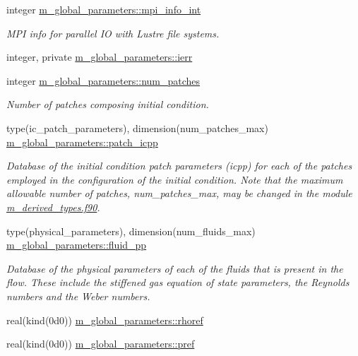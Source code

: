 \begin{DoxyCompactItemize}
\item 
integer \hyperlink{namespacem__global__parameters_a2663d07998d11d25e223cd7ad0bbd748}{m\+\_\+global\+\_\+parameters\+::mpi\+\_\+info\+\_\+int}
\begin{DoxyCompactList}\small\item\em M\+PI info for parallel IO with Lustre file systems. \end{DoxyCompactList}\item 
integer, private \hyperlink{namespacem__global__parameters_a46461347b5094736adfa94ef005b49a6}{m\+\_\+global\+\_\+parameters\+::ierr}
\item 
integer \hyperlink{namespacem__global__parameters_a5e346daa48cf24534ceca2f656a57255}{m\+\_\+global\+\_\+parameters\+::num\+\_\+patches}
\begin{DoxyCompactList}\small\item\em Number of patches composing initial condition. \end{DoxyCompactList}\item 
type(ic\+\_\+patch\+\_\+parameters), dimension(num\+\_\+patches\+\_\+max) \hyperlink{namespacem__global__parameters_ab5fc97fce88eefa124865cab08aa2250}{m\+\_\+global\+\_\+parameters\+::patch\+\_\+icpp}
\begin{DoxyCompactList}\small\item\em Database of the initial condition patch parameters (icpp) for each of the patches employed in the configuration of the initial condition. Note that the maximum allowable number of patches, num\+\_\+patches\+\_\+max, may be changed in the module \hyperlink{m__derived__types_8f90}{m\+\_\+derived\+\_\+types.\+f90}. \end{DoxyCompactList}\item 
type(physical\+\_\+parameters), dimension(num\+\_\+fluids\+\_\+max) \hyperlink{namespacem__global__parameters_a7297abec8863ecabf95e24ebdae46a17}{m\+\_\+global\+\_\+parameters\+::fluid\+\_\+pp}
\begin{DoxyCompactList}\small\item\em Database of the physical parameters of each of the fluids that is present in the flow. These include the stiffened gas equation of state parameters, the Reynolds numbers and the Weber numbers. \end{DoxyCompactList}\item 
real(kind(0d0)) \hyperlink{namespacem__global__parameters_a485a360d73013d7bce1daa01df404534}{m\+\_\+global\+\_\+parameters\+::rhoref}
\item 
real(kind(0d0)) \hyperlink{namespacem__global__parameters_aae2170af8a68c7dcdd91910aad867ef4}{m\+\_\+global\+\_\+parameters\+::pref}

\end{DoxyCompactItemize}
